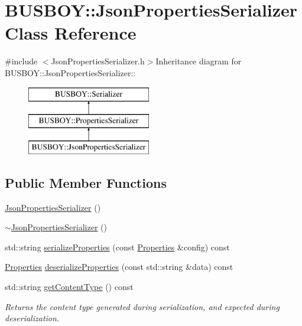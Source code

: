 \hypertarget{classBUSBOY_1_1JsonPropertiesSerializer}{
\section{BUSBOY::JsonPropertiesSerializer Class Reference}
\label{classBUSBOY_1_1JsonPropertiesSerializer}
}


{\ttfamily \#include $<$JsonPropertiesSerializer.h$>$}Inheritance diagram for BUSBOY::JsonPropertiesSerializer::\begin{figure}[H]
\begin{center}
\leavevmode
\includegraphics[height=3cm]{classBUSBOY_1_1JsonPropertiesSerializer}
\end{center}
\end{figure}
\subsection*{Public Member Functions}
\begin{DoxyCompactItemize}
\item 
\hyperlink{classBUSBOY_1_1JsonPropertiesSerializer_a3f6db7a2a72dd0a821cef14446e79a0a}{JsonPropertiesSerializer} ()
\item 
\hyperlink{classBUSBOY_1_1JsonPropertiesSerializer_a379962712b6499081cde613865424c9c}{$\sim$JsonPropertiesSerializer} ()
\item 
std::string \hyperlink{classBUSBOY_1_1JsonPropertiesSerializer_ac0ff156d10457163c883e668011da97e}{serializeProperties} (const \hyperlink{classBUSBOY_1_1Properties}{Properties} \&config) const 
\item 
\hyperlink{classBUSBOY_1_1Properties}{Properties} \hyperlink{classBUSBOY_1_1JsonPropertiesSerializer_ac42a8bb4281c5a4c079df3be8fd972d2}{deserializeProperties} (const std::string \&data) const 
\item 
std::string \hyperlink{classBUSBOY_1_1JsonPropertiesSerializer_ae05a9840dc947cb95e541e58b1af32ac}{getContentType} () const 
\begin{DoxyCompactList}\small\item\em Returns the content type generated during serialization, and expected during deserialization. \item\end{DoxyCompactList}\end{DoxyCompactItemize}


